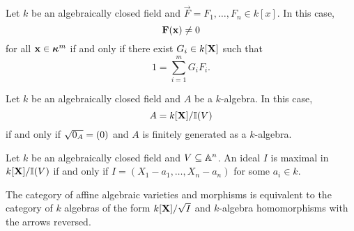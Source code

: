 \documentclass{ximera}
\begin{document}
\begin{corollary}
  Let $k$ be an algebraically closed field and $\vec{F} =
  F_1,\dots,F_n\in k[x]$. In this case,
  \[
  \mathbf{F}(\mathbf{x}) \ne 0
  \]
  for all $\mathbf{x}\in\boldsymbol{\kappa}^m$ if and only if there exist $G_i\in k[\mathbf X]$ such that
  \[
  1 = \sum_{i=1}^m G_i F_i.
  \]
\end{corollary}

\begin{corollary}
  Let $k$ be an algebraically closed field and $A$ be a $k$-algebra.
  In this case,
  \[
  A = k[\mathbf X]/\mathbb I(V) 
  \]
  if and only if $\sqrt{0_A} = (0)$ and $A$ is finitely generated as a
  $k$-algebra.
\end{corollary}


\begin{corollary}
  Let $k$ be an algebraically closed field and $V\subseteq\mathbb A^n$. An ideal $I$ is maximal in
  $k[\mathbf X]/\mathbb I(V)$ if and only if $I= (X_1-a_1,\dots,X_n-a_n)$ for some $a_i\in
  k$.
\end{corollary}

\begin{corollary}
  The category of affine algebraic varieties and morphisms is
  equivalent to the category of $k$ algebras of the form
  $k[\mathbf X]/\sqrt{I}$ and $k$-algebra homomorphisms with the arrows
  reversed.
\end{corollary}
\end{document}
